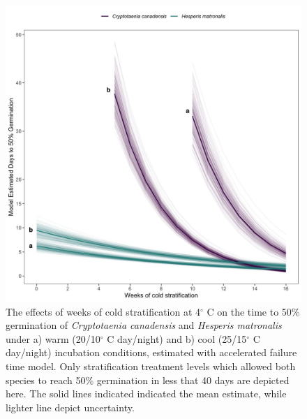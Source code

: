 \documentclass{article}[11pt]
\begin{document}
\begin{figure}[h!]
    \centering
          \includegraphics[width=\textwidth]{..//figure/AFTsivansive.jpeg}
\caption{The effects of weeks of cold stratification at 4$^{\circ}$ C on the time to 50\% germination of \textit {Cryptotaenia canadensis} and \textit{Hesperis matronalis} under a) warm (20/10$^{\circ}$ C day/night) and b) cool (25/15$^{\circ}$ C day/night) incubation conditions, estimated with accelerated failure time model. Only stratification treatment levels which allowed both species to reach 50\% germination in less that 40 days are depicted here. The solid lines indicated indicated the mean estimate, while lighter line depict uncertainty.} %
    \label{fig:aft}
\end{figure}
\end{document}
